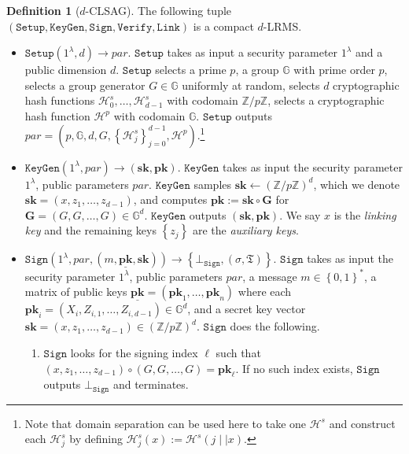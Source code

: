 \documentclass{mrl}
\theoremstyle{plain}
\theoremstyle{definition}
\newtheorem{defn}{Definition}[section]
\begin{document}
\begin{defn}[$d$-CLSAG]\label{def:clsag}
The following tuple $(\texttt{Setup}, \texttt{KeyGen}, \texttt{Sign}, \texttt{Verify}, \texttt{Link})$ is a compact $d$-LRMS.

\begin{itemize}
\item $\texttt{Setup}(1^\lambda, d) \to \textit{par}$. $\texttt{Setup}$ takes as input a security parameter $1^\lambda$ and a public dimension $d$. $\texttt{Setup}$ selects a prime $p$, a group $\mathbb{G}$ with prime order $p$, selects a group generator $G \in \mathbb{G}$ uniformly at random, selects $d$ cryptographic hash functions $\mathcal{H}^s_0, \ldots, \mathcal{H}^s_{d-1}$ with codomain $\mathbb{Z}/p\mathbb{Z}$, selects a cryptographic hash function $\mathcal{H}^p$ with codomain $\mathbb{G}$. $\texttt{Setup}$ outputs $\textit{par} = \left( p,\mathbb{G}, d, G, \left\{\mathcal{H}^s_j\right\}_{j=0}^{d-1}, \mathcal{H}^p\right)$.\footnote{Note that domain separation can be used here to take one $\mathcal{H}^s$ and construct each $\mathcal{H}^s_j$ by defining $\mathcal{H}^s_j(x) := \mathcal{H}^s(j \mid\mid x)$.}

\item $\texttt{KeyGen}(1^\lambda, \textit{par}) \to (\textbf{sk}, \textbf{pk})$. $\texttt{KeyGen}$ takes as input the security parameter $1^\lambda$, public parameters $\textit{par}$. $\texttt{KeyGen}$ samples $\textbf{sk} \leftarrow (\mathbb{Z}/p\mathbb{Z})^d$, which we denote $\textbf{sk} = (x, z_1, \ldots, z_{d-1})$, and computes $\textbf{pk} := \textbf{sk} \circ \textbf{G}$ for $\textbf{G} = (G, G, \ldots, G) \in \mathbb{G}^d$. $\texttt{KeyGen}$ outputs $(\textbf{sk}, \textbf{pk})$. We say $x$ is the \textit{linking key} and the remaining keys $\left\{z_j\right\}$ are the \textit{auxiliary keys}.

\item $\texttt{Sign}\left(1^\lambda, \textit{par}, (m, \underline{\textbf{pk}}, \textbf{sk})\right) \to \left\{\bot_{\texttt{Sign}}, (\sigma, \mathfrak{T})\right\}$. $\texttt{Sign}$ takes as input the security parameter $1^\lambda$, public parameters $\textit{par}$, a message $m \in \left\{0,1\right\}^*$, a matrix of public keys $\underline{\textbf{pk}} = (\textbf{pk}_1, \ldots, \textbf{pk}_n)$ where each $\textbf{pk}_i = (X_i, Z_{i,1}, \ldots, Z_{i,d-1}) \in \mathbb{G}^d$, and a secret key vector $\textbf{sk} = (x,z_1, \ldots, z_{d-1}) \in (\mathbb{Z}/p\mathbb{Z})^d$. $\texttt{Sign}$ does the following.

\begin{enumerate}
\item $\texttt{Sign}$ looks for the signing index $\ell$ such that $(x, z_1, \ldots, z_{d-1}) \circ (G, G, \ldots, G) = \textbf{pk}_\ell$. If no such index exists, $\texttt{Sign}$ outputs $\bot_{\texttt{Sign}}$ and terminates.


\end{enumerate}
\end{itemize}
\end{defn}
\end{document}
